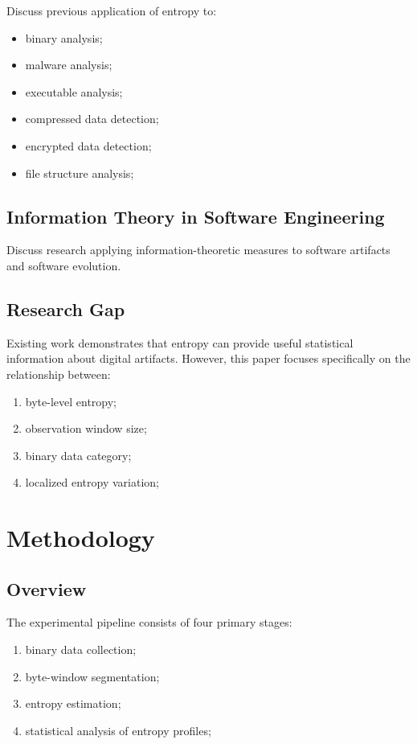 \documentclass[10pt,letterpaper]{article}
\begin{document}
Discuss previous application of entropy to:

\begin{itemize}
    \item binary analysis;
    \item malware analysis;
    \item executable analysis;
    \item compressed data detection;
    \item encrypted data detection;
    \item file structure analysis;
\end{itemize}

\subsection{Information Theory in Software Engineering}

Discuss research applying information-theoretic measures to software artifacts and software evolution.

\subsection{Research Gap}

Existing work demonstrates that entropy can provide useful statistical information about digital artifacts. However, this paper focuses specifically on the relationship between:

\begin{enumerate}
    \item byte-level entropy;
    \item observation window size;
    \item binary data category;
    \item localized entropy variation;
\end{enumerate}


\section{Methodology}

\subsection{Overview}

The experimental pipeline consists of four primary stages:

\begin{enumerate}
    \item binary data collection;
    \item byte-window segmentation;
    \item entropy estimation;
    \item statistical analysis of entropy profiles;
\end{enumerate}
\end{document}
